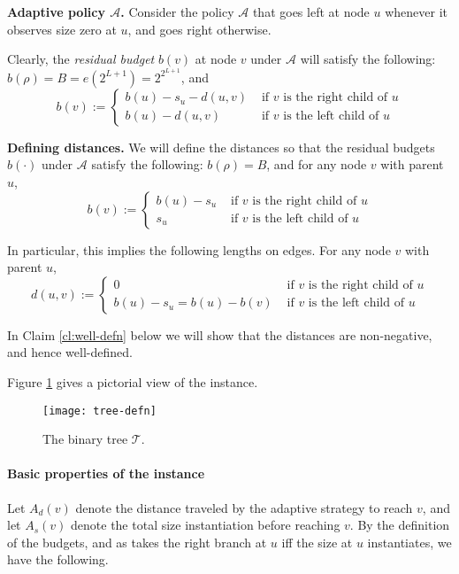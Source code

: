 \documentclass[11pt,letterpaper]{article}
\numberwithin{algorithm}{section}
\newcommand{\A}[0]{{\ensuremath{\mathcal{A}}}\xspace}
\newcommand{\T}{\ensuremath{\mathcal{T}}\xspace}
\newcommand{\q}[1]{e\left(#1\right)}
\begin{document}
{\bf Adaptive policy \A.} Consider the policy \A  that goes left at node $u$ whenever it observes size zero at $u$, and goes right otherwise.

Clearly, the {\em residual budget} $b(v)$ at node $v$ under $\A$  will satisfy the following:
$b(\rho) = B = \q{2^{L+1}}= 2^{2^{L+1}}$, and
$$b(v) := \left\{
\begin{array}{ll}
b(u)-s_u - d(u,v) & \mbox{ if  $v$ is the right child of $u$}\\
b(u) - d(u,v) &  \mbox{ if  $v$ is the left child of $u$}
\end{array}\right.
$$

{\bf Defining distances.} We will define the distances so that the residual budgets $b(\cdot)$ under $\A$ satisfy the following:
$b(\rho)=B$, and for any node $v$ with parent $u$,
$$b(v) := \left\{
\begin{array}{ll}
b(u)-s_u & \mbox{ if  $v$ is the right child of $u$}\\
s_u &  \mbox{ if  $v$ is the left child of $u$}
\end{array}\right.
$$

In particular, this implies the following lengths on edges. For any node $v$ with parent $u$,
$$d(u,v) := \left\{
\begin{array}{ll}
0 & \mbox{ if  $v$ is the right child of $u$}\\
b(u)-s_u = b(u)-b(v) &  \mbox{ if  $v$ is the left child of $u$}
\end{array}\right.
$$

In Claim \ref{cl:well-defn} below we will show that the distances are non-negative, and hence well-defined.


Figure \ref{fig:tree-def} gives a pictorial view of the instance.

\begin{figure}[ht]
  \begin{centering}
    \texttt{[image: tree-defn]}
    \caption{The binary tree \T. \label{fig:tree-def}}
  \end{centering}
\end{figure}


\paragraph{Basic properties of the instance}

Let $A_d(v)$ denote the distance traveled by the adaptive strategy  to reach $v$, and let $A_s(v)$ denote the total size instantiation before reaching $v$. By the definition of the budgets, and as  takes the right branch at $u$ iff the size at $u$ instantiates, we have the following.
\end{document}
